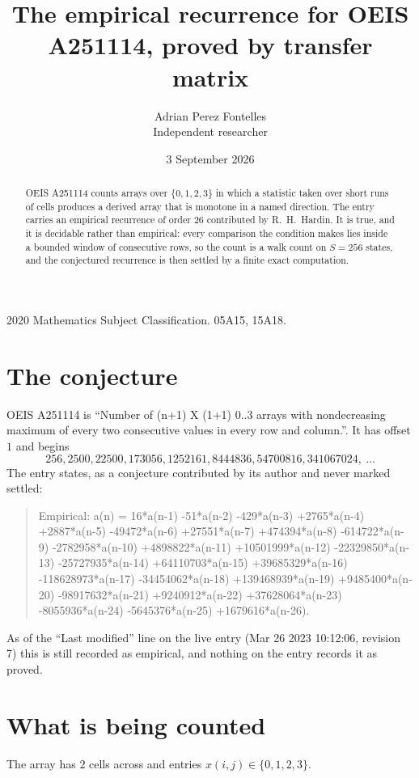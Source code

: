 \documentclass[11pt,a4paper]{article}
\title{The empirical recurrence for OEIS A251114, proved by transfer matrix}
\author{Adrian Perez Fontelles\\ \small Independent researcher}
\date{3 September 2026}
\theoremstyle{plain}
\theoremstyle{definition}
\begin{document}
\maketitle

\begin{abstract}
OEIS A251114 counts arrays over $\{0,1,2,3\}$ in which a statistic taken over short runs
of cells produces a derived array that is monotone in a named direction. The entry carries an
empirical recurrence of order $26$ contributed by R.~H.~Hardin. It is true, and it is
decidable rather than empirical: every comparison the condition makes lies inside a bounded
window of consecutive rows, so the count is a walk count on $S=256$ states, and the
conjectured recurrence is then settled by a finite exact computation.
\end{abstract}

\noindent\small 2020 Mathematics Subject Classification. 05A15, 15A18.\normalsize

\section{The conjecture}

OEIS A251114 is ``Number of (n+1) X (1+1) 0..3 arrays with nondecreasing maximum of every two consecutive values in every row and column.''. It has offset $1$ and begins
\[
256, 2500, 22500, 173056, 1252161, 8444836, 54700816, 341067024,\ \dots
\]
The entry states, as a conjecture contributed by its author and never marked settled:
\begin{quote}
Empirical: a(n) = 16*a(n-1) -51*a(n-2) -429*a(n-3) +2765*a(n-4) +2887*a(n-5) -49472*a(n-6) +27551*a(n-7) +474394*a(n-8) -614722*a(n-9) -2782958*a(n-10) +4898822*a(n-11) +10501999*a(n-12) -22329850*a(n-13) -25727935*a(n-14) +64110703*a(n-15) +39685329*a(n-16) -118628973*a(n-17) -34454062*a(n-18) +139468939*a(n-19) +9485400*a(n-20) -98917632*a(n-21) +9240912*a(n-22) +37628064*a(n-23) -8055936*a(n-24) -5645376*a(n-25) +1679616*a(n-26).
\end{quote}
As of the ``Last modified'' line on the live entry (Mar 26 2023 10:12:06, revision 7) this is still
recorded as empirical, and nothing on the entry records it as proved.

\section{What is being counted}

The array has $2$ cells across and entries $x(i,j)\in\{0,1,2,3\}$.
\end{document}
